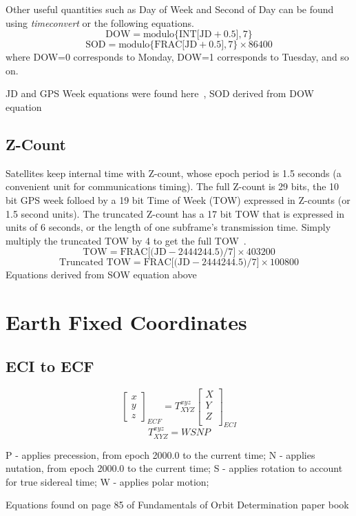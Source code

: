 Other useful quantities such as Day of Week and  Second of Day can be found using \emph{timeconvert} or the following equations.
\[\mbox{DOW}=\mbox{modulo\{INT[JD}+0.5],7\}\]
\[\mbox{SOD}=\mbox{modulo\{FRAC[JD}+0.5],7\}\times 86400\]
where DOW=0 corresponds to Monday, DOW=1 corresponds to Tuesday, and so on.

JD and GPS Week equations were found here~\cite[pp. 36-37]{hlc:gtp}, SOD derived from DOW equation
\subsection{Z-Count}
Satellites keep internal time with Z-count, whose epoch period is 1.5 seconds (a convenient unit for communications timing). The full Z-count is 29 bits, the 10 bit GPS week folloed by a 19 bit Time of Week (TOW) expressed in Z-counts (or 1.5 second units). The truncated Z-count has a 17 bit TOW that is expressed in units of 6 seconds, or the length of one subframe's transmission time. Simply multiply the truncated TOW by 4 to get the full TOW~\cite[pp. 86-88]{tsui:fgpsr}.
\[ \mbox{TOW}=\mbox{FRAC[(JD}-2444244.5)/7]\times 403200 \]
\[ \mbox{Truncated TOW}=\mbox{FRAC[(JD}-2444244.5)/7]\times 100800 \]
Equations derived from SOW equation above
\section{Earth Fixed Coordinates}
\subsection{ECI to ECF}
\[\left[\begin{array}{c} x \\ y \\ z \end{array}\right]_{ECF}=T_{XYZ}^{xyz}\left[\begin{array}{c} X \\ Y \\ Z \\ \end{array}\right]_{ECI}\]
\[T_{XYZ}^{xyz}=WSNP\]

P - applies precession, from epoch 2000.0 to the current time;
N - applies nutation, from epoch 2000.0 to the current time;
S - applies rotation to account for true sidereal time;
W - applies polar motion;

Equations found on page 85 of Fundamentals of Orbit Determination paper book

